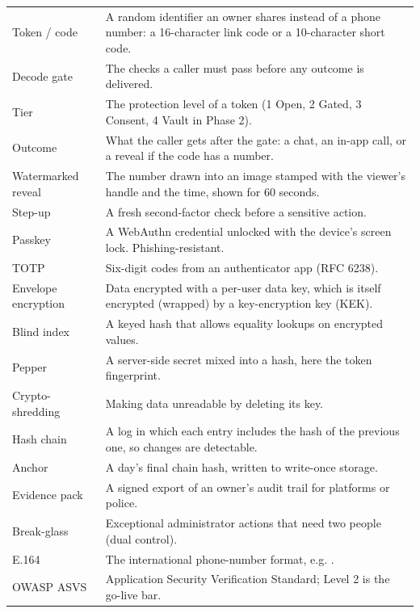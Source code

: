 \begin{longtable}{@{}L{3.6cm}p{11.6cm}@{}}
\toprule
{} &  \\
\midrule\endhead
Token / code & A random identifier an owner shares instead of a phone number: a 16-character link code or a 10-character short code. \\
Decode gate & The checks a caller must pass before any outcome is delivered. \\
Tier & The protection level of a token (1 Open, 2 Gated, 3 Consent, 4 Vault in Phase 2). \\
Outcome & What the caller gets after the gate: a chat, an in-app call, or a reveal if the code has a number. \\
Watermarked reveal & The number drawn into an image stamped with the viewer's handle and the time, shown for 60 seconds. \\
Step-up & A fresh second-factor check before a sensitive action. \\
Passkey & A WebAuthn credential unlocked with the device's screen lock. Phishing-resistant. \\
TOTP & Six-digit codes from an authenticator app (RFC 6238). \\
Envelope encryption & Data encrypted with a per-user data key, which is itself encrypted (wrapped) by a key-encryption key (KEK). \\
Blind index & A keyed hash that allows equality lookups on encrypted values. \\
Pepper & A server-side secret mixed into a hash, here the token fingerprint. \\
Crypto-shredding & Making data unreadable by deleting its key. \\
Hash chain & A log in which each entry includes the hash of the previous one, so changes are detectable. \\
Anchor & A day's final chain hash, written to write-once storage. \\
Evidence pack & A signed export of an owner's audit trail for platforms or police. \\
Break-glass & Exceptional administrator actions that need two people (dual control). \\
E.164 & The international phone-number format, e.g. . \\
OWASP ASVS & Application Security Verification Standard; Level 2 is the go-live bar. \\
\bottomrule
\end{longtable}
